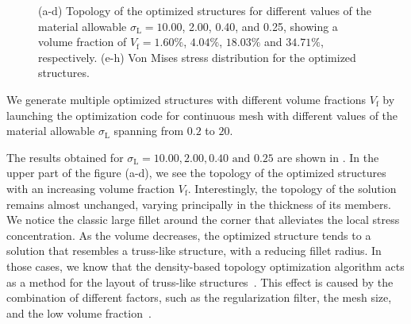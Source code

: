 \begin{figure}
    \hfill
    \hfill
    \hfill
    \caption{(a-d) Topology of the optimized structures for different values of the material allowable $\sigma_\text{L}=10.00$, 2.00, 0.40, and 0.25, showing a volume fraction of $V_\text{f}=1.60\%$, $4.04\%$, $18.03\%$ and $34.71\%$, respectively. (e-h) Von Mises stress distribution for the optimized structures.}
    \label{fig:03_to_sol}
\end{figure}
We generate multiple optimized structures with different volume fractions $V_\text{f}$ by launching the optimization code for continuous mesh with different values of the material allowable $\sigma_\text{L}$ spanning from $0.2$ to $20$.

The results obtained for $\sigma_\text{L}=10.00,2.00,0.40\text{ and }0.25$ are shown in . In the upper part of the figure (a-d), we see the topology of the optimized structures with an increasing volume fraction $V_\text{f}$. Interestingly, the topology of the solution remains almost unchanged, varying principally in the thickness of its members. We notice the classic large fillet around the corner that alleviates the local stress concentration. As the volume decreases, the optimized structure tends to a solution that resembles a truss-like structure, with a reducing fillet radius. In those cases, we know that the density-based topology optimization algorithm acts as a method for the layout of truss-like structures~. This effect is caused by the combination of different factors, such as the regularization filter, the mesh size, and the low volume fraction~. 

